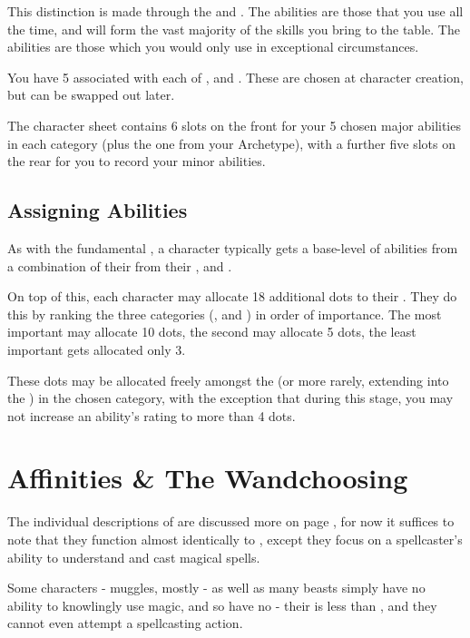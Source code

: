 This distinction is made through the  and . The  abilities are those that you use all the time, and will form the vast majority of the skills you bring to the table. The  abilities are those which you would only use in exceptional circumstances. 

You have 5  associated with each of ,  and . These are chosen at character creation, but can be swapped out later. 

The character sheet contains 6 slots on the front for your 5 chosen major abilities in each category (plus the one from your Archetype), with a further five slots on the rear for you to record your minor abilities. 
\subsection{Assigning Abilities}




As with the fundamental , a character typically gets a base-level of abilities from a combination of their  from their ,  and .

On top of this, each character may allocate 18 additional dots to their . They do this by ranking the three categories (,  and ) in order of importance. The most important may allocate 10 dots, the second may allocate 5 dots, the least important gets allocated only 3.

These dots may be allocated freely amongst the  (or more rarely, extending into the ) in the chosen category, with the exception that during this stage, you may not increase an ability's rating to more than 4 dots. 


\section{Affinities \& The Wandchoosing} \label{S:Wandchoosing}

The individual descriptions of  are discussed more on page \pageref{S:DiscDescs}, for now it suffices to note that they function almost identically to , except they focus on a spellcaster's ability to understand and cast magical spells. 

Some characters - muggles, mostly - as well as many beasts simply have no ability to knowlingly use magic, and so have no  - their  is less than , and they cannot even attempt a spellcasting action. 

